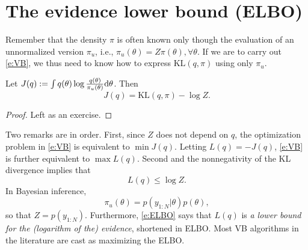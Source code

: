 
\section{The evidence lower bound (ELBO)}
\label{s:elbo}
Remember that the density $\pi$ is often known only though the evaluation of an unnormalized version $\pi_u$, i.e., $\pi_u(\theta) = Z\pi(\theta), \forall \theta$.
If we are to carry out \eqref{e:VB}, we thus need to know how to express $\text{KL}(q,\pi)$ using only $\pi_u$.

\begin{lemma}
Let $J(q) := \int q(\theta) \log \frac{q(\theta)}{\pi_u(\theta)}\mathrm{d}\theta$.
Then
\begin{equation}
J(q) = \text{KL}(q, \pi) - \log Z.
\label{e:preELBO}
\end{equation}
\end{lemma}

\begin{proof}
  Left as an exercise.
\end{proof}

Two remarks are in order.
First, since $Z$ does not depend on $q$, the optimization problem in \eqref{e:VB} is equivalent to $\min J(q)$.
Letting $ L(q) = -J(q)$, \eqref{e:VB} is further equivalent to $\max L(q)$.
Second and the nonnegativity of the KL divergence implies that
\begin{equation}
L(q) \leq \log Z.
\label{e:ELBO}
\end{equation}
In Bayesian inference,
$$
\pi_u(\theta) = p(y_{1:N}\vert\theta) p(\theta),
$$
so that $Z=p(y_{1:N})$.
Furthermore, \eqref{e:ELBO} says that $L(q)$ is \emph{a lower bound for the (logarithm of the) evidence}, shortened in ELBO.
Most VB algorithms in the literature are cast as maximizing the ELBO.

